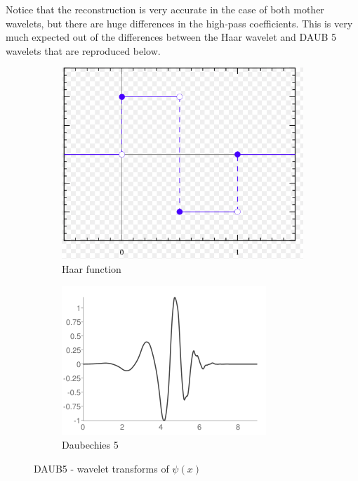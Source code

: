\documentclass[12pt]{article}
\begin{document}
Notice that the reconstruction is very accurate in the case of both mother wavelets, but there are huge differences in the high-pass coefficients. This is very much expected out of the differences between the Haar wavelet and DAUB 5 wavelets that are reproduced below. 

\begin{figure}[h]
	\centering
	\begin{subfigure}[h]{0.20\textwidth}
		\centering
		\includegraphics[width=\textwidth]{haar.png}
		\caption{Haar function}
	\end{subfigure}
	\begin{subfigure}[h]{0.20\textwidth}
		\centering
		\includegraphics[width=\textwidth]{daub5.png}
		\caption{Daubechies 5}
	\end{subfigure}
	\caption{DAUB5 - wavelet transforms of $\psi(x)$}
\end{figure}
\end{document}
